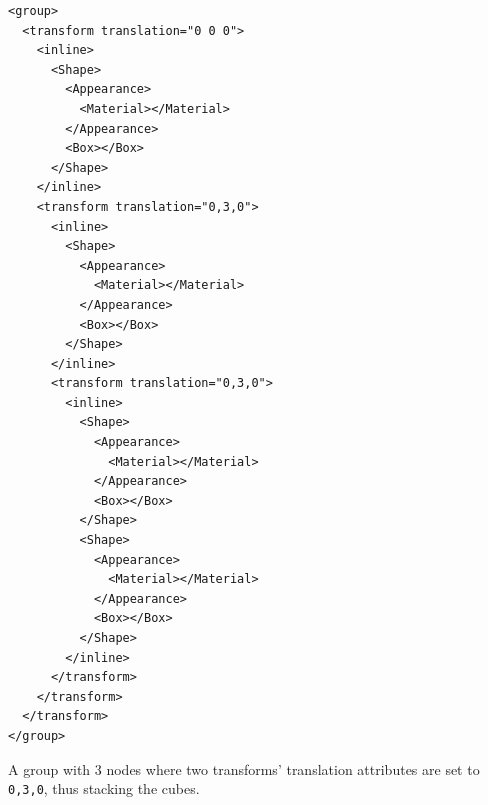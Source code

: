 \begin{listing}
  \begin{verbatim}
<group>
  <transform translation="0 0 0">
    <inline>
      <Shape>
        <Appearance>
          <Material></Material>
        </Appearance>
        <Box></Box>
      </Shape>
    </inline>
    <transform translation="0,3,0">
      <inline>
        <Shape>
          <Appearance>
            <Material></Material>
          </Appearance>
          <Box></Box>
        </Shape>
      </inline>
      <transform translation="0,3,0">
        <inline>
          <Shape>
            <Appearance>
              <Material></Material>
            </Appearance>
            <Box></Box>
          </Shape>
          <Shape>
            <Appearance>
              <Material></Material>
            </Appearance>
            <Box></Box>
          </Shape>
        </inline>
      </transform>
    </transform>
  </transform>
</group>
  \end{verbatim}
  \caption{A group with 3 nodes where two transforms' translation attributes are set to \texttt{0,3,0}, thus stacking the cubes.}
  \label{list:stack}
\end{listing}

